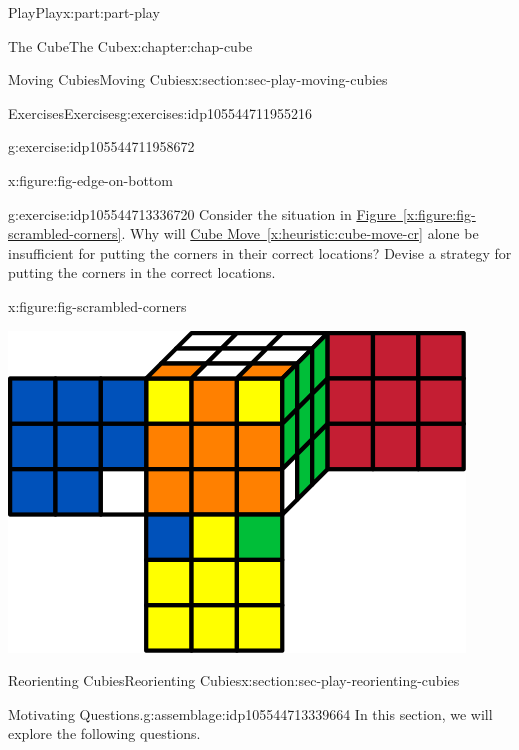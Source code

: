 \documentclass[oneside,10pt,]{book}
\newcommand{\xreffont}{\relax}
\numberwithin{equation}{section}
\begin{document}
\begin{partptx}{Play}{}{Play}{}{}{x:part:part-play}
\begin{chapterptx}{The Cube}{}{The Cube}{}{}{x:chapter:chap-cube}
\begin{sectionptx}{Moving Cubies}{}{Moving Cubies}{}{}{x:section:sec-play-moving-cubies}
\begin{exercises-subsection-numberless}{Exercises}{}{Exercises}{}{}{g:exercises:idp105544711955216}
\begin{divisionexercise}{3}{}{}{g:exercise:idp105544711958672}
\begin{figureptx}{}{x:figure:fig-edge-on-bottom}{}
\begin{image}{0.25}{0.5}{0.25}
\end{image}%
\tcblower
\end{figureptx}%
\end{divisionexercise}%
\begin{divisionexercise}{4}{}{}{g:exercise:idp105544713336720}%
Consider the situation in \hyperref[x:figure:fig-scrambled-corners]{Figure~{\xreffont\ref{x:figure:fig-scrambled-corners}}}. Why will \hyperref[x:heuristic:cube-move-cr]{Cube Move~{\xreffont\ref{x:heuristic:cube-move-cr}}} alone be insufficient for putting the corners in their correct locations? Devise a strategy for putting the corners in the correct locations.%
\begin{figureptx}{}{x:figure:fig-scrambled-corners}{}%
\begin{image}{0.25}{0.5}{0.25}%
\includegraphics[width=\linewidth]{./images/scrambled_corners.svg}
\end{image}%
\tcblower
\end{figureptx}%
\end{divisionexercise}%
\end{exercises-subsection-numberless}
\end{sectionptx}
%
%
\typeout{************************************************}
\typeout{************************************************}
%
\begin{sectionptx}{Reorienting Cubies}{}{Reorienting Cubies}{}{}{x:section:sec-play-reorienting-cubies}
\begin{assemblage}{Motivating Questions.}{g:assemblage:idp105544713339664}%
In this section, we will explore the following questions. %
\begin{enumerate}

\end{enumerate}
\end{assemblage}
\end{sectionptx}
\end{chapterptx}
\end{partptx}
\end{document}
